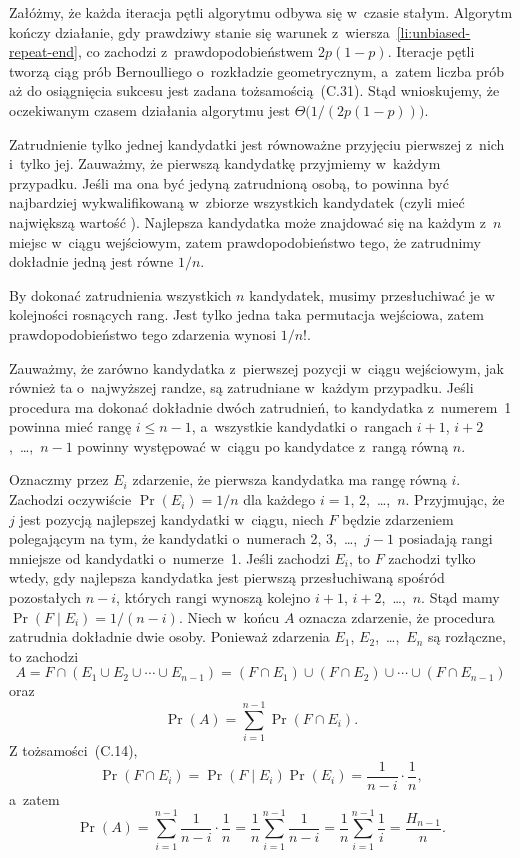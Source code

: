 Załóżmy, że każda iteracja pętli algorytmu odbywa się w~czasie stałym. Algorytm kończy działanie, gdy prawdziwy stanie się warunek z~wiersza~\ref{li:unbiased-repeat-end}, co zachodzi z~prawdopodobieństwem $2p(1-p)$. Iteracje pętli tworzą ciąg prób Bernoulliego o~rozkładzie geometrycznym, a~zatem liczba prób aż do osiągnięcia sukcesu jest zadana tożsamością~(C.31). Stąd wnioskujemy, że oczekiwanym czasem działania algorytmu jest $\Theta\bigl(1/(2p(1-p))\bigr)$.


\exercise %
Zatrudnienie tylko jednej kandydatki jest równoważne przyjęciu pierwszej z~nich i~tylko jej. Zauważmy, że pierwszą kandydatkę przyjmiemy w~każdym przypadku. Jeśli ma ona być jedyną zatrudnioną osobą, to powinna być najbardziej wykwalifikowaną w~zbiorze wszystkich kandydatek (czyli mieć największą wartość ). Najlepsza kandydatka może znajdować się na każdym z~$n$ miejsc w~ciągu wejściowym, zatem prawdopodobieństwo tego, że zatrudnimy dokładnie jedną jest równe $1/n$.

By dokonać zatrudnienia wszystkich $n$ kandydatek, musimy przesłuchiwać je w kolejności rosnących rang. Jest tylko jedna taka permutacja wejściowa, zatem prawdopodobieństwo tego zdarzenia wynosi $1/n!$.

\exercise %
Zauważmy, że zarówno kandydatka z~pierwszej pozycji w~ciągu wejściowym, jak również ta o~najwyższej randze, są zatrudniane w~każdym przypadku. Jeśli procedura  ma dokonać dokładnie dwóch zatrudnień, to kandydatka z~numerem~1 powinna mieć rangę $i\le n-1$, a~wszystkie kandydatki o~rangach $i+1$, $i+2$,~\dots,~$n-1$ powinny występować w~ciągu po kandydatce z~rangą równą $n$.

Oznaczmy przez $E_i$ zdarzenie, że pierwsza kandydatka ma rangę równą $i$. Zachodzi oczywiście $\Pr(E_i)=1/n$ dla każdego $i=1$, 2,~\dots,~$n$. Przyjmując, że $j$ jest pozycją najlepszej kandydatki w~ciągu, niech $F$ będzie zdarzeniem polegającym na tym, że kandydatki o~numerach 2, 3,~\dots,~$j-1$ posiadają rangi mniejsze od kandydatki o~numerze~1. Jeśli zachodzi $E_i$, to $F$ zachodzi tylko wtedy, gdy najlepsza kandydatka jest pierwszą przesłuchiwaną spośród pozostałych $n-i$, których rangi wynoszą kolejno $i+1$, $i+2$,~\dots,~$n$. Stąd mamy $\Pr(F\mid E_i)=1/(n-i)$. Niech w~końcu $A$ oznacza zdarzenie, że procedura  zatrudnia dokładnie dwie osoby. Ponieważ zdarzenia $E_1$, $E_2$,~\dots,~$E_n$ są rozłączne, to zachodzi
\[
	A = F\cap(E_1\cup E_2\cup\cdots\cup E_{n-1}) = (F\cap E_1)\cup(F\cap E_2)\cup\cdots\cup(F\cap E_{n-1})
\]
oraz
\[
	\Pr(A) = \sum_{i=1}^{n-1}\Pr(F\cap E_i).
\]
Z tożsamości~(C.14),
\[
	\Pr(F\cap E_i) = \Pr(F\mid E_i)\Pr(E_i) = \frac{1}{n-i}\cdot\frac{1}{n},
\]
a~zatem
\[
	\Pr(A) = \sum_{i=1}^{n-1}\frac{1}{n-i}\cdot\frac{1}{n} = \frac{1}{n}\sum_{i=1}^{n-1}\frac{1}{n-i} = \frac{1}{n}\sum_{i=1}^{n-1}\frac{1}{i} = \frac{H_{n-1}}{n}.
\]

